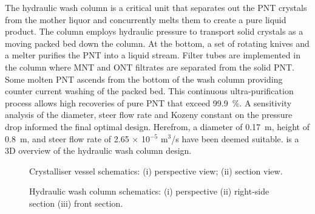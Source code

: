 The hydraulic wash column is a critical unit that separates out the PNT crystals from the mother liquor and concurrently melts them to create a pure liquid product. The column employs hydraulic pressure to transport solid crystals as a moving packed bed down the column. At the bottom, a set of rotating knives and a melter purifies the PNT into a liquid stream. Filter tubes are implemented in the column where MNT and ONT filtrates are separated from the solid PNT. Some molten PNT ascends from the bottom of the wash column providing counter current washing of the packed bed. This continuous ultra-purification process allows high recoveries of pure PNT that exceed \SI{99.9}{\percent}. A sensitivity analysis of the diameter,  steer flow rate and Kozeny constant on the pressure drop informed the final optimal design. Herefrom, a diameter of \SI{0.17}{\m}, height of \SI{0.8}{\m}, and steer flow rate of 2.65 $\times$ 10$^{-5}$ m$^{3}$/s have been deemed suitable.  is a 3D overview of the hydraulic wash column design.


\begin{figure}[h]
    \centering
    \begin{minipage}[t]{0.4\textwidth}
        
        \caption{Crystalliser vessel schematics: (i) perspective view; (ii) section view.}
        \label{fig:crystalliser schematic executive}
    \end{minipage}\hfill
    \begin{minipage}[t]{0.55\textwidth}
        
        \caption{Hydraulic wash column schematics: (i) perspective (ii) right-side section (iii) front section.}
        \label{fig:wash column schematic executive}
    \end{minipage}
\end{figure}

